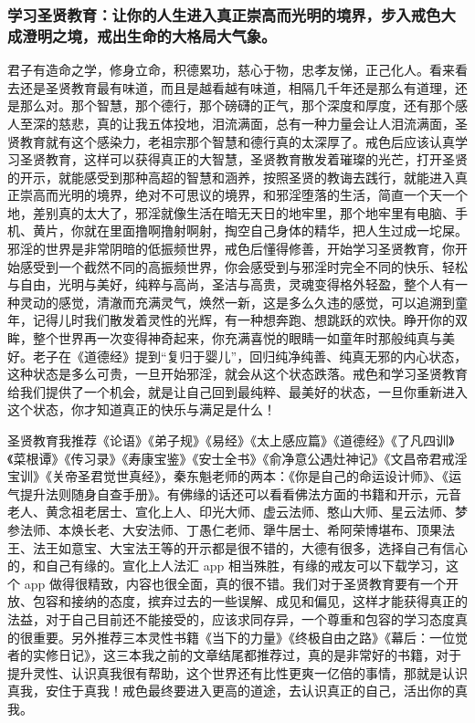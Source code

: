 \subsubsection{学习圣贤教育：让你的人生进入真正崇高而光明的境界，步入戒色大成澄明之境，戒出生命的大格局大气象。}

君子有造命之学，修身立命，积德累功，慈心于物，忠孝友悌，正己化人。看来看去还是圣贤教育最有味道，而且是越看越有味道，相隔几千年还是那么有道理，还是那么对。那个智慧，那个德行，那个磅礴的正气，那个深度和厚度，还有那个感人至深的慈悲，真的让我五体投地，泪流满面，总有一种力量会让人泪流满面，圣贤教育就有这个感染力，老祖宗那个智慧和德行真的太深厚了。戒色后应该认真学习圣贤教育，这样可以获得真正的大智慧，圣贤教育散发着璀璨的光芒，打开圣贤的开示，就能感受到那种高超的智慧和涵养，按照圣贤的教诲去践行，就能进入真正崇高而光明的境界，绝对不可思议的境界，和邪淫堕落的生活，简直一个天一个地，差别真的太大了，邪淫就像生活在暗无天日的地牢里，那个地牢里有电脑、手机、黄片，你就在里面撸啊撸射啊射，掏空自己身体的精华，把人生过成一坨屎。邪淫的世界是非常阴暗的低振频世界，戒色后懂得修善，开始学习圣贤教育，你开始感受到一个截然不同的高振频世界，你会感受到与邪淫时完全不同的快乐、轻松与自由，光明与美好，纯粹与高尚，圣洁与高贵，灵魂变得格外轻盈，整个人有一种灵动的感觉，清澈而充满灵气，焕然一新，这是多么久违的感觉，可以追溯到童年，记得儿时我们散发着灵性的光辉，有一种想奔跑、想跳跃的欢快。睁开你的双眸，整个世界再一次变得神奇起来，你充满喜悦的眼睛一如童年时那般纯真与美好。老子在《道德经》提到“复归于婴儿”，回归纯净纯善、纯真无邪的内心状态，这种状态是多么可贵，一旦开始邪淫，就会从这个状态跌落。戒色和学习圣贤教育给我们提供了一个机会，就是让自己回到最纯粹、最美好的状态，一旦你重新进入这个状态，你才知道真正的快乐与满足是什么！

圣贤教育我推荐《论语》《弟子规》《易经》《太上感应篇》《道德经》《了凡四训》《菜根谭》《传习录》《寿康宝鉴》《安士全书》《俞净意公遇灶神记》《文昌帝君戒淫宝训》《关帝圣君觉世真经》，秦东魁老师的两本：《你是自己的命运设计师》、《运气提升法则随身自查手册》。有佛缘的话还可以看看佛法方面的书籍和开示，元音老人、黄念祖老居士、宣化上人、印光大师、虚云法师、憨山大师、星云法师、梦参法师、本焕长老、大安法师、丁愚仁老师、犟牛居士、希阿荣博堪布、顶果法王、法王如意宝、大宝法王等的开示都是很不错的，大德有很多，选择自己有信心的，和自己有缘的。宣化上人法汇 app 相当殊胜，有缘的戒友可以下载学习，这个 app 做得很精致，内容也很全面，真的很不错。我们对于圣贤教育要有一个开放、包容和接纳的态度，摈弃过去的一些误解、成见和偏见，这样才能获得真正的法益，对于自己目前还不能接受的，应该求同存异，一个尊重和包容的学习态度真的很重要。另外推荐三本灵性书籍《当下的力量》《终极自由之路》《幕后：一位觉者的实修日记》，这三本我之前的文章结尾都推荐过，真的是非常好的书籍，对于提升灵性、认识真我很有帮助，这个世界还有比性更爽一亿倍的事情，那就是认识真我，安住于真我！戒色最终要进入更高的道途，去认识真正的自己，活出你的真我。

